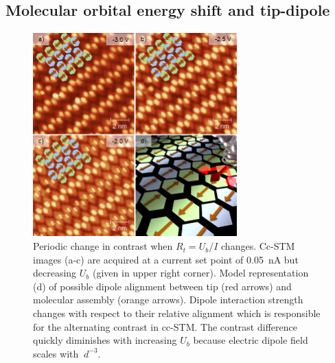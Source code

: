\subsection{Molecular orbital energy shift and tip-dipole}

\begin{figure}[b] \centering
	\includegraphics[width=0.7\textwidth]{./images/paper/helicene/fig4}
	\caption{Periodic change in contrast when $R_t = U_b / I$ changes. Cc-STM images (a-c) are acquired at a current set point of \SI{0.05}{\nano \ampere} but decreasing $U_b$ (given in upper right corner). Model representation (d) of possible dipole alignment between tip (red arrows) and molecular assembly (orange arrows). Dipole interaction strength changes with respect to their relative alignment which is responsible for the alternating contrast in cc-STM. The contrast difference quickly diminishes with increasing $U_b$ because electric dipole field scales with $~d^{-3}$.}
	\label{fig:hel-fig4}
\end{figure}

